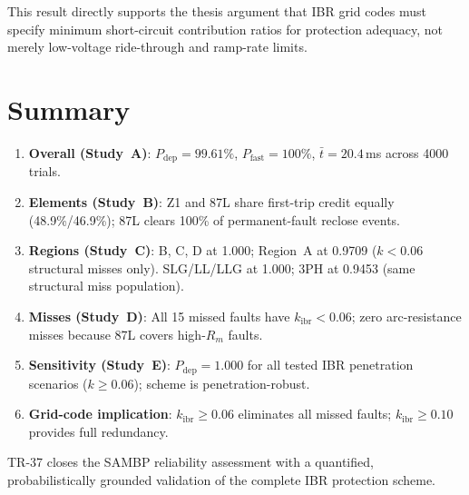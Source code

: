 \documentclass[11pt,a4paper]{article}
\begin{document}
\noindent
This result directly supports the thesis argument that IBR grid codes must
specify minimum short-circuit contribution ratios for protection adequacy,
not merely low-voltage ride-through and ramp-rate limits.

\section{Summary}
\label{sec:summary}

\begin{enumerate}
  \item \textbf{Overall (Study~A)}: $P_\mathrm{dep}=99.61\%$, $P_\mathrm{fast}=100\%$,
    $\bar{t}=20.4$\,ms across 4000 trials.

  \item \textbf{Elements (Study~B)}: Z1 and 87L share first-trip credit equally
    (48.9\%/46.9\%); 87L clears 100\% of permanent-fault reclose events.

  \item \textbf{Regions (Study~C)}: B, C, D at 1.000; Region~A at 0.9709
    ($k<0.06$ structural misses only).  SLG/LL/LLG at 1.000; 3PH at 0.9453
    (same structural miss population).

  \item \textbf{Misses (Study~D)}: All 15 missed faults have $k_\mathrm{ibr}<0.06$;
    zero arc-resistance misses because 87L covers high-$R_m$ faults.

  \item \textbf{Sensitivity (Study~E)}: $P_\mathrm{dep}=1.000$ for all tested
    IBR penetration scenarios ($k\geq0.06$); scheme is penetration-robust.

  \item \textbf{Grid-code implication}: $k_\mathrm{ibr}\geq0.06$ eliminates all
    missed faults; $k_\mathrm{ibr}\geq0.10$ provides full redundancy.
\end{enumerate}

\noindent
TR-37 closes the SAMBP reliability assessment with a quantified, probabilistically
grounded validation of the complete IBR protection scheme.



\end{document}

